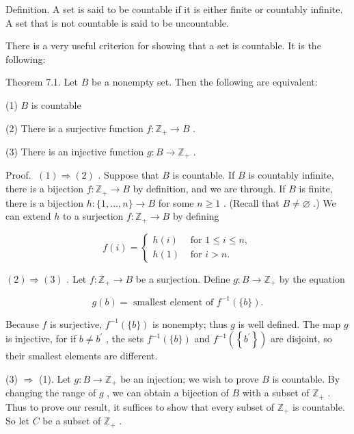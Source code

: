 \documentclass[10pt]{article}
\begin{document}
Definition. A set is said to be countable if it is either finite or countably infinite. A set that is not countable is said to be uncountable.

There is a very useful criterion for showing that a set is countable. It is the following:

Theorem 7.1. Let \(B\) be a nonempty set. Then the following are equivalent:

(1) \(B\) is countable

(2) There is a surjective function \(f : {\mathbb{Z}}_{ + } \rightarrow  B\) .

(3) There is an injective function \(g : B \rightarrow  {\mathbb{Z}}_{ + }\) .

Proof. \(\;\left( 1\right)  \Rightarrow  \left( 2\right)\) . Suppose that \(B\) is countable. If \(B\) is countably infinite, there is a bijection \(f : {\mathbb{Z}}_{ + } \rightarrow  B\) by definition, and we are through. If \(B\) is finite, there is a bijection \(h : \{ 1,\ldots ,n\}  \rightarrow  B\) for some \(n \geq  1\) . (Recall that \(B \neq  \varnothing\) .) We can extend \(h\) to a surjection \(f : {\mathbb{Z}}_{ + } \rightarrow  B\) by defining

\[
f\left( i\right)  = \left\{  \begin{array}{ll} h\left( i\right) & \text{ for }1 \leq  i \leq  n, \\  h\left( 1\right) & \text{ for }i > n. \end{array}\right.
\]

\(\left( 2\right)  \Rightarrow  \left( 3\right)\) . Let \(f : {\mathbb{Z}}_{ + } \rightarrow  B\) be a surjection. Define \(g : B \rightarrow  {\mathbb{Z}}_{ + }\) by the equation

\[
g\left( b\right)  = \text{ smallest element of }{f}^{-1}\left( {\{ b\} }\right) .
\]

Because \(f\) is surjective, \({f}^{-1}\left( {\{ b\} }\right)\) is nonempty; thus \(g\) is well defined. The map \(g\) is injective, for if \(b \neq  {b}^{\prime }\) , the sets \({f}^{-1}\left( {\{ b\} }\right)\) and \({f}^{-1}\left( \left\{  {b}^{\prime }\right\}  \right)\) are disjoint, so their smallest elements are different.

(3) \(\Rightarrow\) (1). Let \(g : B \rightarrow  {\mathbb{Z}}_{ + }\) be an injection; we wish to prove \(B\) is countable. By changing the range of \(g\) , we can obtain a bijection of \(B\) with a subset of \({\mathbb{Z}}_{ + }\) . Thus to prove our result, it suffices to show that every subset of \({\mathbb{Z}}_{ + }\) is countable. So let \(C\) be a subset of \({\mathbb{Z}}_{ + }\) .
\end{document}
